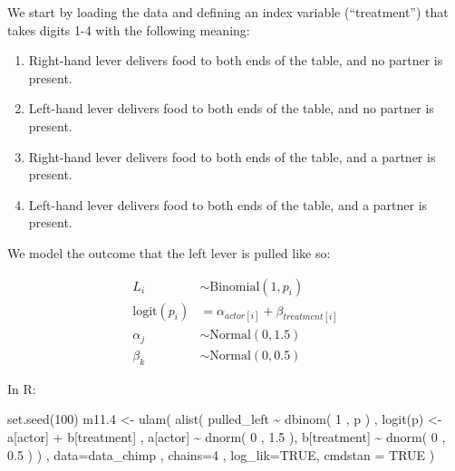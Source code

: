 \documentclass[
]{book}
\newenvironment{Shaded}{\begin{snugshade}}{\end{snugshade}}
\newcommand{\AttributeTok}[1]{\textcolor[rgb]{0.77,0.63,0.00}{#1}}
\newcommand{\ConstantTok}[1]{\textcolor[rgb]{0.00,0.00,0.00}{#1}}
\newcommand{\DecValTok}[1]{\textcolor[rgb]{0.00,0.00,0.81}{#1}}
\newcommand{\FloatTok}[1]{\textcolor[rgb]{0.00,0.00,0.81}{#1}}
\newcommand{\FunctionTok}[1]{\textcolor[rgb]{0.00,0.00,0.00}{#1}}
\newcommand{\NormalTok}[1]{#1}
\newcommand{\OtherTok}[1]{\textcolor[rgb]{0.56,0.35,0.01}{#1}}
\newcommand{\SpecialCharTok}[1]{\textcolor[rgb]{0.00,0.00,0.00}{#1}}
\providecommand{\tightlist}{%
  \setlength{\itemsep}{0pt}\setlength{\parskip}{0pt}}
\begin{document}
We start by loading the data and defining an index variable (``treatment'') that takes digits 1-4 with the following meaning:

\begin{enumerate}
\def\labelenumi{\arabic{enumi}.}
\tightlist
\item
  Right-hand lever delivers food to both ends of the table, and no partner is present.
\item
  Left-hand lever delivers food to both ends of the table, and no partner is present.
\item
  Right-hand lever delivers food to both ends of the table, and a partner is present.
\item
  Left-hand lever delivers food to both ends of the table, and a partner is present.
\end{enumerate}

We model the outcome that the left lever is pulled like so:

\[
\begin{aligned}
L_i &\sim \text{Binomial}(1,p_i) \\
\text{logit}(p_i) &= \alpha_{actor[i]} + \beta_{treatment[i]} \\
\alpha_j &\sim \text{Normal}(0,1.5) \\
\beta_k &\sim \text{Normal}(0,0.5)
\end{aligned}
\]

In R:

\begin{Shaded}
\begin{Highlighting}[]
\FunctionTok{set.seed}\NormalTok{(}\DecValTok{100}\NormalTok{)}
\NormalTok{m11}\FloatTok{.4} \OtherTok{\textless{}{-}} \FunctionTok{ulam}\NormalTok{( }\FunctionTok{alist}\NormalTok{(}
\NormalTok{  pulled\_left }\SpecialCharTok{\textasciitilde{}} \FunctionTok{dbinom}\NormalTok{( }\DecValTok{1}\NormalTok{ , p ) , }
  \FunctionTok{logit}\NormalTok{(p) }\OtherTok{\textless{}{-}}\NormalTok{ a[actor] }\SpecialCharTok{+}\NormalTok{ b[treatment] , }
\NormalTok{  a[actor] }\SpecialCharTok{\textasciitilde{}} \FunctionTok{dnorm}\NormalTok{( }\DecValTok{0}\NormalTok{ , }\FloatTok{1.5}\NormalTok{ ), }
\NormalTok{  b[treatment] }\SpecialCharTok{\textasciitilde{}} \FunctionTok{dnorm}\NormalTok{( }\DecValTok{0}\NormalTok{ , }\FloatTok{0.5}\NormalTok{ )}
\NormalTok{) , }\AttributeTok{data=}\NormalTok{data\_chimp , }\AttributeTok{chains=}\DecValTok{4}\NormalTok{ , }\AttributeTok{log\_lik=}\ConstantTok{TRUE}\NormalTok{, }\AttributeTok{cmdstan =} \ConstantTok{TRUE}\NormalTok{ )}
\end{Highlighting}
\end{Shaded}
\end{document}
